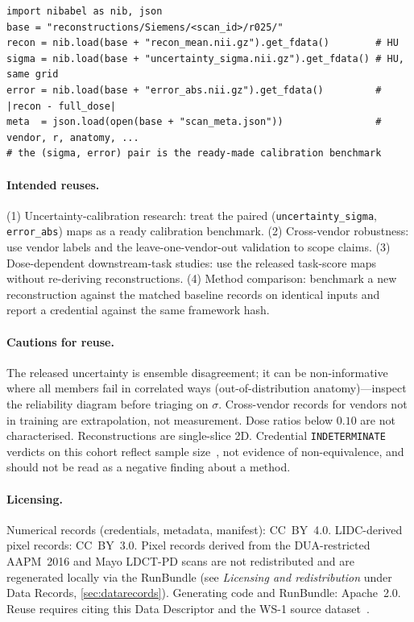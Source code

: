 \documentclass{article}
\begin{document}
\begin{verbatim}
import nibabel as nib, json
base = "reconstructions/Siemens/<scan_id>/r025/"
recon = nib.load(base + "recon_mean.nii.gz").get_fdata()        # HU
sigma = nib.load(base + "uncertainty_sigma.nii.gz").get_fdata() # HU, same grid
error = nib.load(base + "error_abs.nii.gz").get_fdata()         # |recon - full_dose|
meta  = json.load(open(base + "scan_meta.json"))                # vendor, r, anatomy, ...
# the (sigma, error) pair is the ready-made calibration benchmark
\end{verbatim}

\paragraph{Intended reuses.} (1) Uncertainty-calibration research: treat
the paired (\texttt{uncertainty\_sigma}, \texttt{error\_abs}) maps as a
ready calibration benchmark. (2) Cross-vendor robustness: use vendor
labels and the leave-one-vendor-out validation to scope claims. (3)
Dose-dependent downstream-task studies: use the released task-score maps
without re-deriving reconstructions. (4) Method comparison: benchmark a
new reconstruction against the matched baseline records on identical
inputs and report a credential against the same framework hash.

\paragraph{Cautions for reuse.} The released uncertainty is ensemble
disagreement; it can be non-informative where all members fail in
correlated ways (out-of-distribution anatomy)---inspect the reliability
diagram before triaging on $\sigma$. Cross-vendor records for vendors not
in training are extrapolation, not measurement. Dose ratios below $0.10$
are not characterised. Reconstructions are single-slice 2D. Credential
\texttt{INDETERMINATE} verdicts on this cohort reflect sample
size~\citep{ws2framework}, not evidence of non-equivalence, and should not
be read as a negative finding about a method.

\paragraph{Licensing.} Numerical records (credentials, metadata,
manifest): CC~BY~4.0. LIDC-derived pixel records: CC~BY~3.0. Pixel records
derived from the DUA-restricted AAPM~2016 and Mayo LDCT-PD scans are not
redistributed and are regenerated locally via the RunBundle (see
\emph{Licensing and redistribution} under Data Records,
\autoref{sec:datarecords}). Generating code and RunBundle: Apache~2.0.
Reuse requires citing this Data Descriptor and the WS-1 source
dataset~\citep{ws1dataset}.
\end{document}
